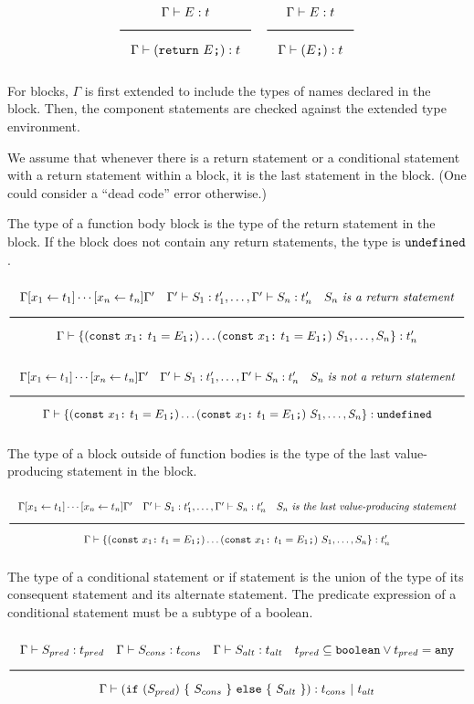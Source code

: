 \noindent
\[
  \Rule{\Gamma \vdash E : t}{\Gamma \vdash (\texttt{return}\ E\texttt{;}) : t}
  \quad
  \Rule{\Gamma \vdash E : t}{\Gamma \vdash (E\texttt{;}) : t}
\]
\noindent

For blocks, $\Gamma$ is first extended to include the types of names declared in the block.
Then, the component statements are checked against the extended type environment.

We assume that whenever there is a return statement or a conditional statement with a return statement within a
block, it is the last statement in the block. (One could consider a ``dead code'' error otherwise.)

The type of a function body block is the type of the return statement in the block.
If the block does not contain any return statements, the type is $\texttt{undefined}$.

\noindent
\[
  \Rule{\Gamma [x_1 \leftarrow t_1] \cdots [x_n \leftarrow t_n] \Gamma' \quad
    \Gamma' \vdash S_1 : t'_1, \ldots, \Gamma' \vdash S_n : t'_n \quad S_n\ \textit{is a return statement}}{
    \Gamma \vdash \{ (\texttt{const}\ x_1 \texttt{:}\ t_1 = E_1\texttt{;}) \ldots (\texttt{const}\ x_1 \texttt{:}\ t_1 = E_1\texttt{;})\
    S_1, \ldots, S_n\} : t'_n}
\]
\noindent
\[
  \Rule{\Gamma [x_1 \leftarrow t_1] \cdots [x_n \leftarrow t_n] \Gamma' \quad
    \Gamma' \vdash S_1 : t'_1, \ldots, \Gamma' \vdash S_n : t'_n \quad S_n\ \textit{is not a return statement}}{
    \Gamma \vdash \{ (\texttt{const}\ x_1 \texttt{:}\ t_1 = E_1\texttt{;}) \ldots (\texttt{const}\ x_1 \texttt{:}\ t_1 = E_1\texttt{;})\
    S_1, \ldots, S_n\} : \Undefined}
\]
\noindent

The type of a block outside of function bodies is the type of the last value-producing statement in the block.

\noindent
\[
  \Rule{\Gamma [x_1 \leftarrow t_1] \cdots [x_n \leftarrow t_n] \Gamma' \quad
    \Gamma' \vdash S_1 : t'_1, \ldots, \Gamma' \vdash S_n : t'_n \quad S_n\ \textit{is the last value-producing statement}}{
    \Gamma \vdash \{ (\texttt{const}\ x_1 \texttt{:}\ t_1 = E_1\texttt{;}) \ldots (\texttt{const}\ x_1 \texttt{:}\ t_1 = E_1\texttt{;})\
    S_1, \ldots, S_n\} : t'_n}
\]
\noindent

The type of a conditional statement or if statement is the union of the type of its consequent statement and its alternate statement.
The predicate expression of a conditional statement must be a subtype of a boolean.

\noindent
\[
  \Rule{\Gamma \vdash S_{pred} : t_{pred} \quad \Gamma \vdash S_{cons} : t_{cons} \quad \Gamma \vdash S_{alt} : t_{alt}
    \quad t_{pred} \subseteq \Bool \vee t_{pred} = \Any}{\Gamma \vdash (\texttt{if}\ (S_{pred})\ \{\ S_{cons}\ \}\
    \texttt{else}\ \{\ S_{alt}\ \}) : t_{cons}\ |\ t_{alt}}
\]
\noindent
